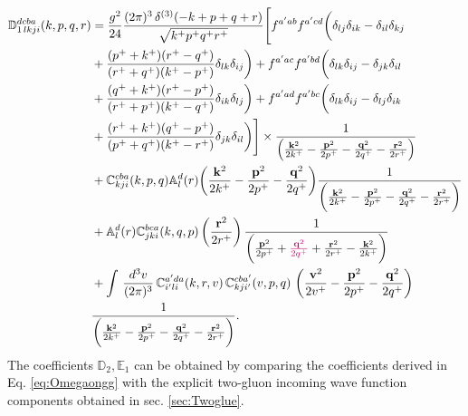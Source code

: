 \documentclass[a4paper,11pt]{article}
\def\v#1{\mathbf{#1}}
\def\mf#1{\mathbb{#1}}
\begin{document}
\begin{align}
    \mf{D}^{dcba}_{1\,lkji}(k,p,q,r) & = 
     \frac{g^{2}}{24} \frac{(2\pi)^{3}\,\delta^{(3)}(-k+p+q+r)}{\sqrt{k^{+}p^{+}q^{+}r^{+}}}\Bigg[f^{a'ab}f^{a'cd}\bigg(\delta_{lj}\delta_{ik}-\delta_{il}\delta_{kj} \notag \\ & +\frac{(p^{+}+k^{+})(r^{+}-q^{+})}{(r^{+}+q^{+})(k^{+}-p^{+})}\delta_{lk}\delta_{ij}\bigg) +f^{a'ac}f^{a'bd}\bigg(\delta_{lk}\delta_{ij}-\delta_{jk}\delta_{il} \notag \\ & +\frac{(q^{+}+k^{+})(r^{+}-p^{+})}{(r^{+}+p^{+})(k^{+}-q^{+})}\delta_{ik}\delta_{lj}\bigg)+f^{a'ad}f^{a'bc}\bigg(\delta_{lk}\delta_{ij}-\delta_{lj}\delta_{ik} \notag \\ & +\frac{(r^{+}+k^{+})(q^{+}-p^{+})}{(p^{+}+q^{+})(k^{+}-r^{+})}\delta_{jk}\delta_{il}\bigg)\Bigg]\times \frac{1}{\left(\frac{\v{k}^{2}}{2k^{+}}-\frac{\v{p}^{2}}{2p^{+}}-\frac{\v{q}^{2}}{2q^{+}}-\frac{\v{r}^{2}}{2r^{+}}\right)}\notag \\ & +\mf{C}^{cba}_{kji}(k,p,q) \mf{A}^{d}_{l}(r)\bigg(\frac{\v{k}^{2}}{2k^{+}}-\frac{\v{p}^{2}}{2p^{+}}-\frac{\v{q}^{2}}{2q^{+}}\bigg) \frac{1}{\bigg(\frac{\v{k}^{2}}{2k^{+}}-\frac{\v{p}^{2}}{2p^{+}}-\frac{\v{q}^{2}}{2q^{+}}-\frac{\v{r}^{2}}{2r^{+}}\bigg)}\notag \\ &  + \mf{A}^{d}_{l}(r)\mf{C}^{bca}_{jki}(k,q,p)\left(\frac{\v{r}^{2}}{2r^{+}}\right) \frac{1}{\bigg(\frac{\v{p}^{2}}{2p^{+}}+{\color{chg}\frac{\v{q}^{2}}{2q^{+}}}+\frac{\v{r}^{2}}{2r^{+}}-\frac{\v{k}^{2}}{2k^{+}}\bigg)}\notag \\ & +\int\, \frac{d^{3}v}{(2\pi)^{3}}\, \mf{C}^{a'da}_{i'li}(k,r,v)\,\mf{C}^{cba'}_{kji'}(v,p,q)\,\left(\frac{\v{v}^{2}}{2v^{+}}-\frac{\v{p}^{2}}{2p^{+}}-\frac{\v{q}^{2}}{2q^{+}}\right)\notag \\ & \frac{1}{\bigg(\frac{\v{k}^{2}}{2k^{+}}-\frac{\v{p}^{2}}{2p^{+}}-\frac{\v{q}^{2}}{2q^{+}}-\frac{\v{r}^{2}}{2r^{+}}\bigg)}.
\end{align}
The coefficients $\mf{D}_{2},\mf{E}_{1}$ can be obtained by comparing the coefficients derived in Eq. \eqref{eq:Omegaongg} with the explicit two-gluon incoming wave function components obtained in sec. \ref{sec:Twoglue}. 
\end{document}
